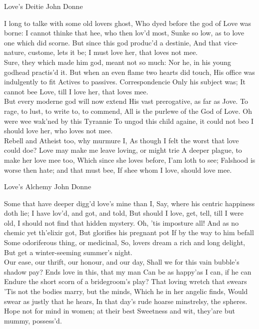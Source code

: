 \begin{poem}
{Love's Deitie}
{John Donne}
 
I long to talke with some old lovers ghost, 
   Who dyed before the god of Love was borne: 
I cannot thinke that hee, who then lov'd most, 
   Sunke so low, as to love one which did scorne. 
But since this god produc'd a destinie, 
And that vice-nature, custome, lets it be; 
   I must love her, that loves not mee.\\

Sure, they which made him god, meant not so much: 
   Nor he, in his young godhead practis'd it. 
But when an even flame two hearts did touch, 
   His office was indulgently to fit 
Actives to passives. Correspondencie 
Only his subject was; It cannot bee 
   Love, till I love her, that loves mee.\\

But every moderne god will now extend 
   His vast prerogative, as far as Jove. 
To rage, to lust, to write to, to commend, 
   All is the purlewe of the God of Love. 
Oh were wee wak'ned by this Tyrannie 
To ungod this child againe, it could not beo 
   I should love her, who loves not mee.\\

Rebell and Atheist too, why murmure I, 
   As though I felt the worst that love could doe? 
Love may make me leave loving, or might trie 
   A deeper plague, to make her love mee too, 
Which since she loves before, I'am loth to see; 
Falshood is worse then hate; and that must bee, 
   If shee whom I love, should love mee.\\
\end{poem}

\begin{poem}
{Love's Alchemy}
{John Donne}
 
Some that have deeper digg'd love's mine than I, 
Say, where his centric happiness doth lie; 
     I have lov'd, and got, and told, 
But should I love, get, tell, till I were old, 
I should not find that hidden mystery. 
     Oh, 'tis imposture all! 
And as no chemic yet th'elixir got, 
     But glorifies his pregnant pot 
     If by the way to him befall 
Some odoriferous thing, or medicinal, 
     So, lovers dream a rich and long delight, 
     But get a winter-seeming summer's night.\\

Our ease, our thrift, our honour, and our day, 
Shall we for this vain bubble's shadow pay? 
     Ends love in this, that my man 
Can be as happy'as I can, if he can 
Endure the short scorn of a bridegroom's play? 
     That loving wretch that swears 
'Tis not the bodies marry, but the minds, 
     Which he in her angelic finds, 
     Would swear as justly that he hears, 
In that day's rude hoarse minstrelsy, the spheres. 
     Hope not for mind in women; at their best 
     Sweetness and wit, they'are but mummy, possess'd.\\
\end{poem}

